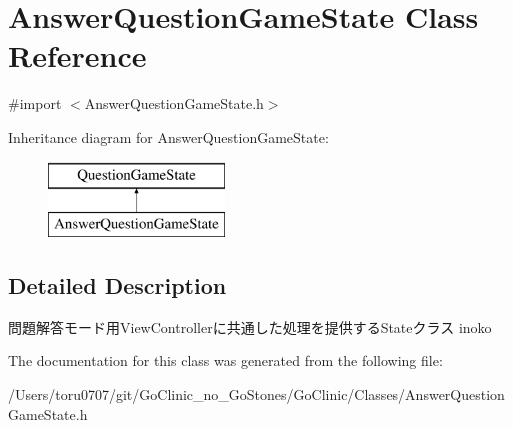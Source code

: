 \hypertarget{interface_answer_question_game_state}{
\section{AnswerQuestionGameState Class Reference}
\label{interface_answer_question_game_state}
}


{\ttfamily \#import $<$AnswerQuestionGameState.h$>$}

Inheritance diagram for AnswerQuestionGameState:\begin{figure}[H]
\begin{center}
\leavevmode
\includegraphics[height=2.000000cm]{interface_answer_question_game_state}
\end{center}
\end{figure}


\subsection{Detailed Description}
問題解答モード用ViewControllerに共通した処理を提供するStateクラス  inoko 

The documentation for this class was generated from the following file:\begin{DoxyCompactItemize}
\item 
/Users/toru0707/git/GoClinic\_\-no\_\-GoStones/GoClinic/Classes/AnswerQuestionGameState.h\end{DoxyCompactItemize}
